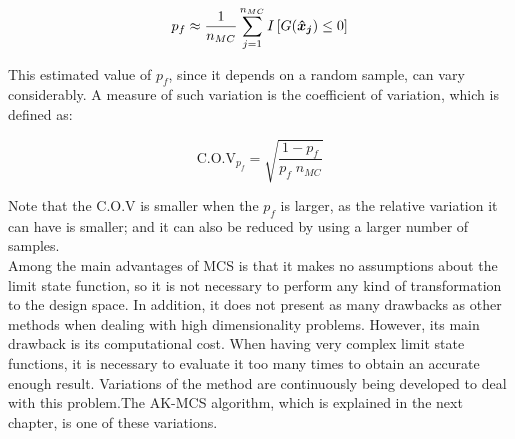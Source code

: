 \begin{equation}
    p_f \approx \frac{1}{n_{MC}} \sum_{j = 1}^{n_{MC}} I\left[ G(\bm{\hat{x}_j}) \leq 0 \right]
\end{equation}

This estimated value of $p_f$, since it depends on a random sample, can vary considerably. A measure of such variation is the coefficient of variation, which is defined as:

\begin{equation}
    \text{C.O.V}_{p_f} = \sqrt{\frac{1-p_f}{p_f \; n_{MC}}}
\end{equation}

Note that the C.O.V is smaller when the $p_f$ is larger, as the relative variation it can have is smaller; and it can also be reduced by using a larger number of samples. \\

Among the main advantages of MCS is that it makes no assumptions about the limit state function, so it is not necessary to perform any kind of transformation to the design space. In addition, it does not present as many drawbacks as other methods when dealing with high dimensionality problems. However, its main drawback is its computational cost. When having very complex limit state functions, it is necessary to evaluate it too many times to obtain an accurate enough result. Variations of the method are continuously being developed to deal with this problem.The AK-MCS algorithm, which is explained in the next chapter, is one of these variations.
